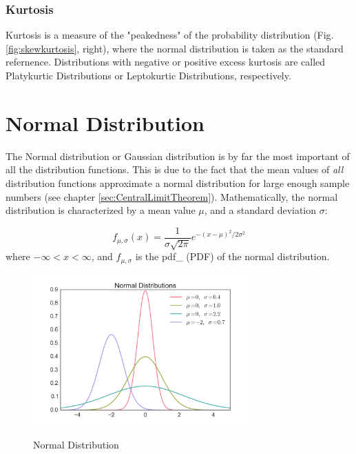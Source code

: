 \subsubsection{Kurtosis}

Kurtosis is a measure of the "peakedness" of the probability distribution (Fig. \ref{fig:skewkurtosis}, right), where the normal distribution is taken as the standard refernence. Distributions with negative or positive excess kurtosis are called Platykurtic Distributions or Leptokurtic Distributions, respectively.

\section{Normal Distribution} \label{sec:normalDistribution}

The Normal distribution or Gaussian distribution is by far the most important of all the distribution functions. This is due to the fact that the mean values of \emph{all} distribution functions approximate a normal distribution for large enough sample numbers (see chapter \ref{sec:CentralLimitTheorem}).
Mathematically, the normal distribution is characterized by a mean value $\mu$, and a standard deviation $\sigma$:

\begin{equation}\label{eq_normal}
     f_{\mu,\sigma} (x) = \frac{1}{\sigma \sqrt{2 \pi}} e^{-( x - \mu )^2 /2 \sigma^2}
\end{equation}
where $ - \infty < x < \infty $, and $f_{\mu,\sigma}$ is the \gls{pdf_} (PDF)  of the normal distribution.

\begin{figure}
  \centering
  \includegraphics[width=0.75\textwidth]{../Images/Normal_Distribution_PDF.png}\\
  \caption{Normal Distribution}\label{fig:normal}
\end{figure}

